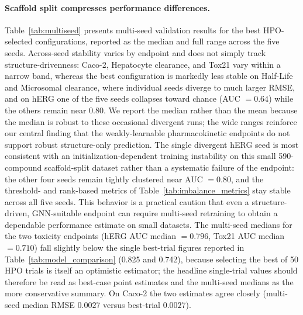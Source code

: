 \documentclass[journal]{IEEEtran}
\begin{document}
\paragraph{Scaffold split compresses performance differences.}
Table~\ref{tab:multiseed} presents multi-seed validation results for the best HPO-selected configurations, reported as the median and full range across the five seeds. Across-seed stability varies by endpoint and does not simply track structure-drivenness: Caco-2, Hepatocyte clearance, and Tox21 vary within a narrow band, whereas the best configuration is markedly less stable on Half-Life and Microsomal clearance, where individual seeds diverge to much larger RMSE, and on hERG one of the five seeds collapses toward chance (AUC $=0.64$) while the others remain near $0.80$. We report the median rather than the mean because the median is robust to these occasional divergent runs; the wide ranges reinforce our central finding that the weakly-learnable pharmacokinetic endpoints do not support robust structure-only prediction. The single divergent hERG seed is most consistent with an initialization-dependent training instability on this small 590-compound scaffold-split dataset rather than a systematic failure of the endpoint: the other four seeds remain tightly clustered near AUC $=0.80$, and the threshold- and rank-based metrics of Table~\ref{tab:imbalance_metrics} stay stable across all five seeds. This behavior is a practical caution that even a structure-driven, GNN-suitable endpoint can require multi-seed retraining to obtain a dependable performance estimate on small datasets. The multi-seed medians for the two toxicity endpoints (hERG AUC median $=0.796$, Tox21 AUC median $=0.710$) fall slightly below the single best-trial figures reported in Table~\ref{tab:model_comparison} (0.825 and 0.742), because selecting the best of 50 HPO trials is itself an optimistic estimator; the headline single-trial values should therefore be read as best-case point estimates and the multi-seed medians as the more conservative summary. On Caco-2 the two estimates agree closely (multi-seed median RMSE $0.0027$ versus best-trial $0.0027$).
\end{document}
